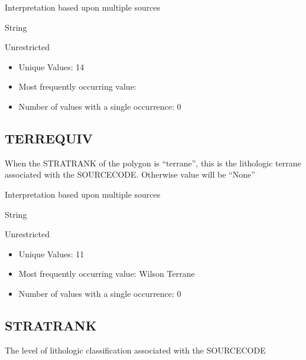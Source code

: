 \documentclass[letterpaper,10pt,english]{sphinxmanual}
\begin{document}
Interpretation based upon multiple sources

String


Unrestricted

\begin{itemize}
\item {} 
Unique Values: 14

\item {} 
Most frequently occurring value:

\item {} 
Number of values with a single occurrence: 0

\end{itemize}


\subsection{TERREQUIV}
\label{\detokenize{field_glossary:terrequiv}}
When the STRATRANK of the polygon is “terrane”, this is the lithologic terrane associated with the SOURCECODE. Otherwise value will be “None”

Interpretation based upon multiple sources

String


Unrestricted

\begin{itemize}
\item {} 
Unique Values: 11

\item {} 
Most frequently occurring value: Wilson Terrane

\item {} 
Number of values with a single occurrence: 0

\end{itemize}


\subsection{STRATRANK}
\label{\detokenize{field_glossary:stratrank}}
The level of lithologic classification associated with the SOURCECODE
\end{document}
